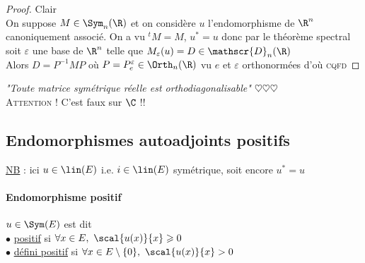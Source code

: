 		\begin{proof}
		\fbox{$\Leftarrow$} Clair\\
		\fbox{$\Rightarrow$} On suppose $M\in \Sym_n(\R)$ et on considère $u$ l'endomorphisme de $\R^n$ canoniquement associé. On a vu $^tM=M$, $u^* =u$ 
		donc par le théorème spectral soit $\varepsilon$ une base de $\R^n$ telle que $M_\varepsilon(u)=D \in\mathscr{D}_n(\R)$\\
		Alors $D = P^{-1}MP$ où $P=P_e^{\varepsilon} \in\Orth_n(\R)$ vu $e$ et $\varepsilon$ orthonormées d'où \textsc{cqfd}
		\end{proof}
		\textit{"Toute matrice symétrique réelle est orthodiagonalisable" $\heartsuit\heartsuit\heartsuit$}\vspace*{0.2cm} \\
		\textsc{Attention !} C'est faux sur $\C$ !!
	\subsection{Endomorphismes autoadjoints positifs}
		\uline{NB} : ici $u\in\lin(E)$ i.e. $i\in\lin(E)$ symétrique, soit encore $u^*=u$\\ \traitd
		\paragraph{Endomorphisme positif}
			$u\in\Sym(E)$ est dit \\
			\hspace*{2cm} $\bullet$ \uline{positif} si $\forall x\in E,~\scal{u(x)}{x} \geqslant 0$ \\
			\hspace*{2cm} $\bullet$ \uline{défini positif} si $\forall x\in E\setminus\{0\},~ \scal{u(x)}{x} >0$ \trait ${}$ \vspace*{-1.3cm} \traitd
